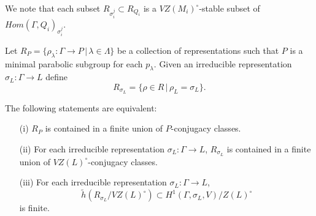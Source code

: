 We note that each subset $R_{\sigma_i^j} \subset R_{Q_i}$ is a $VZ(M_i)^\circ$-stable subset of $Hom(\Gamma, Q_i)_{\sigma_i^j}$.

\begin{lemma}
  Let $R_P = \{\rho_\lambda:\Gamma\rightarrow P\,|\,\lambda\in\Lambda\}$ be a collection of representations such that $P$ is a minimal parabolic subgroup for each $p_\lambda$. Given an irreducible representation $\sigma_L:\Gamma\rightarrow L$ define
  \begin{displaymath}
    R_{\sigma_L} = \{\rho \in R\,|\,\rho_L = \sigma_L\}. 
  \end{displaymath}
  
  The following statements are equivalent:
  \begin{itemize}
    \item[(i)] $R_P$ is contained in a finite union of $P$-conjugacy classes.
    \item[(ii)] For each irreducible representation $\sigma_L:\Gamma\rightarrow L$, $R_{\sigma_L}$ is contained in a finite union of $VZ(L)^\circ$-conjugacy classes.
    \item[(iii)] For each irreducible representation $\sigma_L:\Gamma\rightarrow L$,
      \begin{displaymath}
	\tilde{h}(R_{\sigma_L}/VZ(L)^\circ) \subset H^{1}(\Gamma,\sigma_L,V)/Z(L)^\circ
      \end{displaymath}
      is finite.
  \end{itemize}
  \label{lem:p_h1}
\end{lemma}
